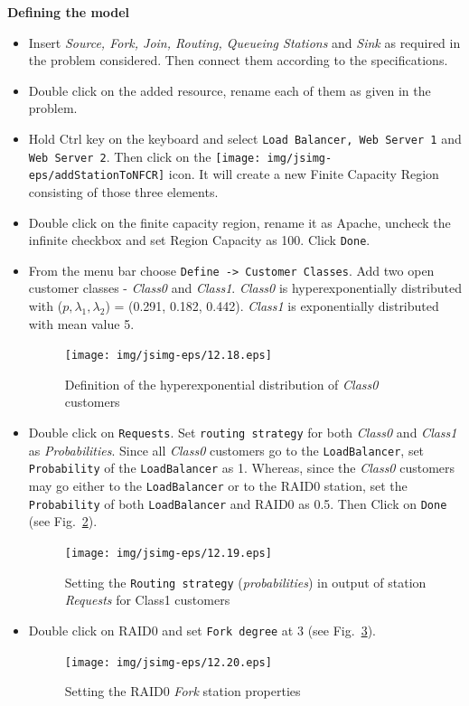 {\large{\textbf{Defining the model}}}
\begin{itemize}
\item Insert \emph{Source, Fork, Join, Routing, Queueing Stations}
and \emph{Sink} as required in the problem considered. Then
connect them according to the specifications. \item Double click
on the added resource, rename each of them as given in the
problem. \item Hold Ctrl key on the keyboard and select
\texttt{Load Balancer, Web Server 1} and \texttt{Web Server 2}.
Then click on the
\texttt{[image: img/jsimg-eps/addStationToNFCR]}
icon. It will create a new Finite Capacity Region consisting of
those three elements. \item Double click on the finite capacity
region, rename it as Apache, uncheck the infinite checkbox and set
Region Capacity as 100. Click \texttt{Done}. \item From the menu
bar choose \texttt{Define -> Customer Classes}. Add two open
customer classes - \emph{Class0} and \emph{Class1}. \emph{Class0}
is hyperexponentially distributed with ($p, \lambda_1, \lambda_2$)
= (0.291, 0.182, 0.442). \emph{Class1} is exponentially
distributed with mean value 5.
\begin{figure}[htb]
    \begin{center}
        \texttt{[image: img/jsimg-eps/12.18.eps]}
    \end{center}
    \caption{Definition of the hyperexponential distribution
    of \emph{Class0} customers}
    \label{fig:hypeexponcl0}
\end{figure}
\item Double click on \texttt{Requests}. Set \texttt{routing
strategy} for both \emph{Class0} and \emph{Class1} as
\emph{Probabilities}. Since all \emph{Class0} customers go to the
\texttt{LoadBalancer}, set \texttt{Probability} of the
\texttt{LoadBalancer} as 1. Whereas, since the \emph{Class0}
customers may go either to the \texttt{LoadBalancer} or to the
RAID0 station, set the \texttt{Probability} of both
\texttt{LoadBalancer} and RAID0 as 0.5. Then Click on
\texttt{Done} (see Fig.~\ref{fig:parroutstrat}).
\begin{figure}[htb]
    \begin{center}
        \texttt{[image: img/jsimg-eps/12.19.eps]}
    \end{center}
    \caption{Setting the \texttt{Routing strategy} (\emph{probabilities}) in output
    of station \emph{Requests} for Class1 customers}
    \label{fig:parroutstrat}
\end{figure}
\item Double click on RAID0 and set \texttt{Fork degree} at 3 (see
Fig.~\ref{fig:raid0prop}).
\begin{figure}[htb]
    \begin{center}
        \texttt{[image: img/jsimg-eps/12.20.eps]}
    \end{center}
    \caption{Setting the RAID0 \emph{Fork} station properties}
    \label{fig:raid0prop}
\end{figure}


\end{itemize}
